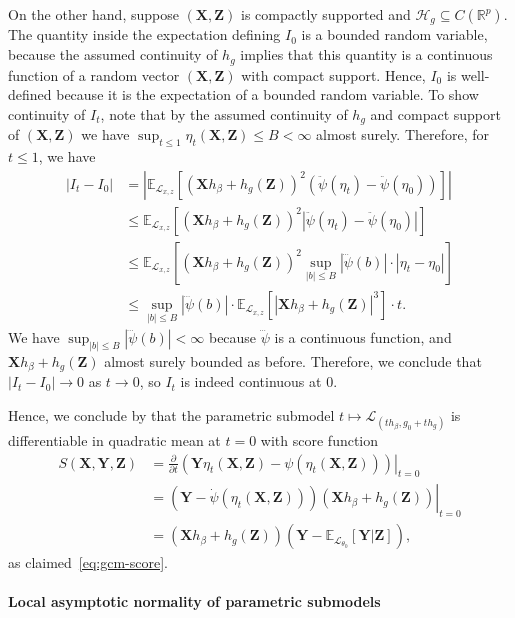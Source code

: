 \documentclass[aos]{imsart}
\theoremstyle{plain}
\theoremstyle{remark}
\newcommand{\E}{\mathbb E}								%
\newcommand{\R}{\mathbb{R}}								%
\newcommand{\prx}{\bm X}								%
\newcommand{\prz}{\bm Z}								%
\newcommand{\pry}{{\bm Y}}								%
\newcommand{\law}{\mathcal L}							%
\renewcommand{\H}{\mathcal H}		 					%
\begin{document}
On the other hand, suppose $(\prx,\prz)$ is compactly supported and $\H_g \subseteq C(\R^p)$. The quantity inside the expectation defining $I_0$ is a bounded random variable, because the assumed continuity of $h_g$ implies that this quantity is a continuous function of a random vector $(\prx, \prz)$ with compact support. Hence, $I_0$ is well-defined because it is the expectation of a bounded random variable. To show continuity of $I_t$, note that by the assumed continuity of $h_g$ and compact support of $(\prx,\prz)$ we have $\sup_{t \leq 1} \eta_t(\prx,\prz) \leq B < \infty$ almost surely. Therefore, for $t \leq 1$, we have
\begin{align*}
	|I_t-I_0|
	&
	=\left|\E_{\law_{x,z}}\left[(\prx h_\beta+h_g(\prz))^2(\ddot{\psi}(\eta_t)-\ddot{\psi}(\eta_0))\right]\right|\\
	&
	\leq \E_{\law_{x,z}}\left[(\prx h_\beta+h_g(\prz))^2|\ddot{\psi}(\eta_t)-\ddot{\psi}(\eta_0)|\right]\\
	&
	\leq \E_{\law_{x,z}}\left[(\prx h_\beta+h_g(\prz))^2\sup_{|b| \leq B}|\dddot{\psi}(b)| \cdot |\eta_t-\eta_0|\right]\\
	&
	\leq \sup_{|b| \leq B}|\dddot{\psi}(b)| \cdot \E_{\law_{x,z}}\left[|\prx h_\beta+h_g(\prz)|^3\right] \cdot t.
\end{align*}
We have $\sup_{|b| \leq B}|\dddot{\psi}(b)| < \infty$ because $\dddot \psi$ is a continuous function, and $\prx h_\beta+h_g(\prz)$ almost surely bounded as before. Therefore, we conclude that $|I_t - I_0| \rightarrow 0$ as $t \rightarrow 0$, so $I_t$ is indeed continuous at 0.

Hence, we conclude by \citet[Lemma 7.6]{VDV1998} that the parametric submodel $t \mapsto \law_{(th_\beta, g_0 + th_g)}$ is differentiable in quadratic mean at $t = 0$ with score function
\begin{align*}
S(\prx, \pry, \prz) &= \left.\frac{\partial}{\partial t}(\pry \eta_t(\prx, \prz) - \psi(\eta_t(\prx, \prz)))\right|_{t = 0} \\
&= \left.(\pry-\dot{\psi}(\eta_t(\prx, \prz)))(\prx h_\beta+h_g(\prz))\right|_{t = 0} \\
&= (\prx h_\beta+h_g(\prz))(\pry-\E_{\law_{\theta_0}}[\pry|\prz]),
\end{align*}
as claimed~\eqref{eq:gcm-score}.

\paragraph*{Local asymptotic normality of parametric submodels}
\end{document}

